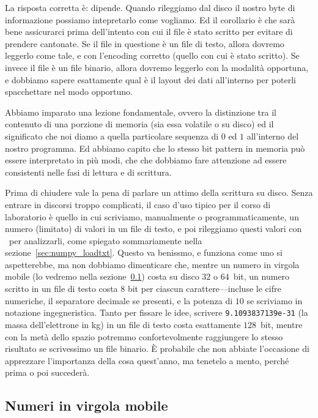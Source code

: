 La risposta corretta \`e: dipende. Quando rileggiamo dal disco il nostro byte di
informazione possiamo intepretarlo come vogliamo. Ed il corollario \`e che sar\`a
bene assicurarci prima dell'intento con cui il file \`e stato scritto per evitare
di prendere cantonate. Se il file in questione \`e un file di testo, allora dovremo
leggerlo come tale, e con l'encoding corretto (quello con cui \`e stato scritto).
Se invece il file \`e un file binario, allora dovremo leggerlo con la modalit\`a
opportuna, e dobbiamo sapere esattamente qual \`e il layout dei dati all'interno
per poterli spacchettare nel modo opportuno.


Abbiamo imparato una lezione fondamentale, ovvero la distinzione tra il contenuto
di una porzione di memoria (sia essa volatile o su disco) ed il significato che
noi diamo a quella particolare sequenza di $0$ ed $1$ all'interno del nostro programma.
Ed abbiamo capito che lo stesso bit pattern in memoria pu\`o essere interpretato
in pi\`u modi, che che dobbiamo fare attenzione ad essere consistenti nelle fasi di
lettura e di scrittura.

Prima di chiudere vale la pena di parlare un attimo della scrittura su disco. Senza
entrare in discorsi troppo complicati, il caso d'uso tipico per il corso di laboratorio
\`e quello in cui scriviamo, manualmente o programmaticamente, un numero (limitato)
di valori in un file di testo, e poi rileggiamo questi valori con \numpy\ per
analizzarli, come spiegato sommariamente nella sezione~\ref{sec:numpy_loadtxt}.
Questo va benissmo, e funziona come uno si aspetterebbe, ma non dobbiamo dimenticare
che, mentre un numero in virgola mobile (lo vedremo nella sezione~\ref{sec:virgola_mobile})
costa su disco $32$ o $64$~bit, un numero scritto in un file di testo costa $8$
bit per ciascun carattere---incluse le cifre numeriche, il separatore decimale se
presenti, e la potenza di $10$ se scriviamo in notazione ingegneristica. Tanto per
fissare le idee, scrivere \texttt{9.1093837139e-31} (la massa dell'elettrone in kg)
in un file di testo costa esattamente $128$~bit, mentre con la met\`a dello spazio
potremmo confortevolmente raggiungere lo stesso risultato se scrivessimo un file
binario. \`E probabile che non abbiate l'occasione di apprezzare l'importanza della
cosa quest'anno, ma tenetelo a mento, perch\'e prima o poi succeder\`a.


\subsection{Numeri in virgola mobile}
\label{sec:virgola_mobile}

